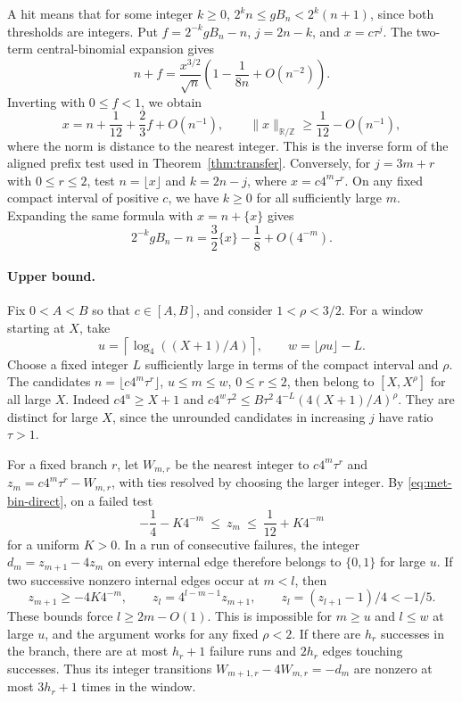 \documentclass[11pt,reqno,a4paper]{amsart}
\theoremstyle{remark}
\begin{document}
A hit means that for some integer \(k\geq0\),
\(2^kn\leq gB_n<2^k(n+1)\), since both thresholds are integers.
Put \(f=2^{-k}gB_n-n\), \(j=2n-k\), and \(x=c\tau^j\).
The two-term central-binomial expansion \cite{app-brent} gives
\[
 n+f=\frac{x^{3/2}}{\sqrt n}
       \left(1-\frac{1}{8n}+O(n^{-2})\right).
\]
Inverting with \(0\leq f<1\), we obtain
\begin{equation}\label{eq:met-bin-inverse}
 x=n+\frac{1}{12}+\frac23 f+O(n^{-1}),\qquad
 \|x\|_{\mathbb R/\mathbb Z}\geq \frac1{12}-O(n^{-1}),
\end{equation}
where the norm is distance to the nearest integer. This is the
inverse form of the aligned prefix test used in
Theorem~\ref{thm:transfer}. Conversely, for \(j=3m+r\) with
\(0\leq r\leq2\), test \(n=\lfloor x\rfloor\) and
\(k=2n-j\), where \(x=c4^m\tau^r\). On any fixed compact interval
of positive \(c\), we have \(k\geq0\) for all sufficiently large
\(m\). Expanding the same formula with \(x=n+\{x\}\) gives
\begin{equation}\label{eq:met-bin-direct}
  2^{-k}gB_n-n=\frac32\{x\}-\frac18+O(4^{-m}).
\end{equation}

\paragraph{Upper bound.}
Fix \(0<A<B\) so that \(c\in[A,B]\), and consider
\(1<\rho<3/2\). For a window starting at \(X\), take
\[
 u=\left\lceil\log_4((X+1)/A)\right\rceil,\qquad
 w=\lfloor\rho u\rfloor-L.
\]
Choose a fixed integer \(L\) sufficiently large in terms of the
compact interval and \(\rho\). The candidates
\(n=\lfloor c4^m\tau^r\rfloor\), \(u\leq m\leq w\),
\(0\leq r\leq2\), then belong to \([X,X^\rho]\) for all large
\(X\). Indeed \(c4^u\geq X+1\) and
\(c4^w\tau^2\leq B\tau^2\,4^{-L}(4(X+1)/A)^\rho\).
They are distinct for large \(X\), since the unrounded candidates
in increasing \(j\) have ratio \(\tau>1\).

For a fixed branch \(r\), let \(W_{m,r}\) be the nearest integer to
\(c4^m\tau^r\) and \(z_m=c4^m\tau^r-W_{m,r}\), with ties resolved
by choosing the larger integer. By \eqref{eq:met-bin-direct}, on a
failed test
\[
 -\frac14-K4^{-m}\ \leq\ z_m\ \leq\ \frac1{12}+K4^{-m}
\]
for a uniform \(K>0\). In a run of consecutive failures, the
integer \(d_m=z_{m+1}-4z_m\) on every internal edge therefore
belongs to \(\{0,1\}\) for large \(u\). If two successive nonzero
internal edges occur at \(m<l\), then
\[
 z_{m+1}\geq-4K4^{-m},\qquad
 z_l=4^{l-m-1}z_{m+1},\qquad z_l=(z_{l+1}-1)/4<-1/5.
\]
These bounds force \(l\geq2m-O(1)\). This is impossible for
\(m\geq u\) and \(l\leq w\) at large \(u\), and the argument
works for any fixed \(\rho<2\). If there are \(h_r\) successes
in the branch, there are at most \(h_r+1\) failure runs and
\(2h_r\) edges touching successes. Thus its integer transitions
\(W_{m+1,r}-4W_{m,r}=-d_m\) are nonzero at most \(3h_r+1\) times
in the window.
\end{document}
